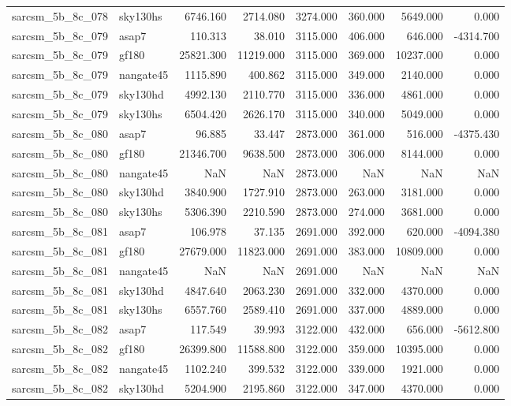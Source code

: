 \begin{tabular}{llrrrrrr}
sarcsm\_5b\_8c\_078 & sky130hs & 6746.160 & 2714.080 & 3274.000 & 360.000 & 5649.000 & 0.000 \\
sarcsm\_5b\_8c\_079 & asap7 & 110.313 & 38.010 & 3115.000 & 406.000 & 646.000 & -4314.700 \\
sarcsm\_5b\_8c\_079 & gf180 & 25821.300 & 11219.000 & 3115.000 & 369.000 & 10237.000 & 0.000 \\
sarcsm\_5b\_8c\_079 & nangate45 & 1115.890 & 400.862 & 3115.000 & 349.000 & 2140.000 & 0.000 \\
sarcsm\_5b\_8c\_079 & sky130hd & 4992.130 & 2110.770 & 3115.000 & 336.000 & 4861.000 & 0.000 \\
sarcsm\_5b\_8c\_079 & sky130hs & 6504.420 & 2626.170 & 3115.000 & 340.000 & 5049.000 & 0.000 \\
sarcsm\_5b\_8c\_080 & asap7 & 96.885 & 33.447 & 2873.000 & 361.000 & 516.000 & -4375.430 \\
sarcsm\_5b\_8c\_080 & gf180 & 21346.700 & 9638.500 & 2873.000 & 306.000 & 8144.000 & 0.000 \\
sarcsm\_5b\_8c\_080 & nangate45 & NaN & NaN & 2873.000 & NaN & NaN & NaN \\
sarcsm\_5b\_8c\_080 & sky130hd & 3840.900 & 1727.910 & 2873.000 & 263.000 & 3181.000 & 0.000 \\
sarcsm\_5b\_8c\_080 & sky130hs & 5306.390 & 2210.590 & 2873.000 & 274.000 & 3681.000 & 0.000 \\
sarcsm\_5b\_8c\_081 & asap7 & 106.978 & 37.135 & 2691.000 & 392.000 & 620.000 & -4094.380 \\
sarcsm\_5b\_8c\_081 & gf180 & 27679.000 & 11823.000 & 2691.000 & 383.000 & 10809.000 & 0.000 \\
sarcsm\_5b\_8c\_081 & nangate45 & NaN & NaN & 2691.000 & NaN & NaN & NaN \\
sarcsm\_5b\_8c\_081 & sky130hd & 4847.640 & 2063.230 & 2691.000 & 332.000 & 4370.000 & 0.000 \\
sarcsm\_5b\_8c\_081 & sky130hs & 6557.760 & 2589.410 & 2691.000 & 337.000 & 4889.000 & 0.000 \\
sarcsm\_5b\_8c\_082 & asap7 & 117.549 & 39.993 & 3122.000 & 432.000 & 656.000 & -5612.800 \\
sarcsm\_5b\_8c\_082 & gf180 & 26399.800 & 11588.800 & 3122.000 & 359.000 & 10395.000 & 0.000 \\
sarcsm\_5b\_8c\_082 & nangate45 & 1102.240 & 399.532 & 3122.000 & 339.000 & 1921.000 & 0.000 \\
sarcsm\_5b\_8c\_082 & sky130hd & 5204.900 & 2195.860 & 3122.000 & 347.000 & 4370.000 & 0.000 \\

\end{tabular}
